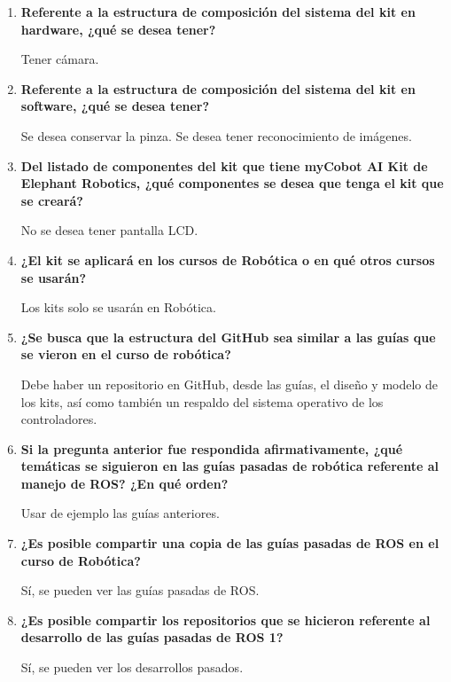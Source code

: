\begin{enumerate}[label=\arabic*.]
    Se desea tener una copa de succión.
    
    \item \textbf{Referente a la estructura de composición del sistema del kit en hardware, ¿qué se desea tener?}
    
    Tener cámara.
    
    \item \textbf{Referente a la estructura de composición del sistema del kit en software, ¿qué se desea tener?}
    
    Se desea conservar la pinza. Se desea tener reconocimiento de imágenes.
    
    \item \textbf{Del listado de componentes del kit que tiene myCobot AI Kit de Elephant Robotics, ¿qué componentes se desea que tenga el kit que se creará?}
    
    No se desea tener pantalla LCD.
    
    \item \textbf{¿El kit se aplicará en los cursos de Robótica o en qué otros cursos se usarán?}
    
    Los kits solo se usarán en Robótica.
    
    \item \textbf{¿Se busca que la estructura del GitHub sea similar a las guías que se vieron en el curso de robótica?}
    
    Debe haber un repositorio en GitHub, desde las guías, el diseño y modelo de los kits, así como también un respaldo del sistema operativo de los controladores.
    
    \item \textbf{Si la pregunta anterior fue respondida afirmativamente, ¿qué temáticas se siguieron en las guías pasadas de robótica referente al manejo de ROS? ¿En qué orden?}
    
    Usar de ejemplo las guías anteriores.
    
    \item \textbf{¿Es posible compartir una copia de las guías pasadas de ROS en el curso de Robótica?}
    
    Sí, se pueden ver las guías pasadas de ROS.
    
    \item \textbf{¿Es posible compartir los repositorios que se hicieron referente al desarrollo de las guías pasadas de ROS 1?}
    
    Sí, se pueden ver los desarrollos pasados.
    

\end{enumerate}
